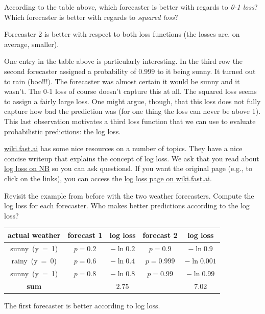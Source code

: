 \documentclass[assignment03_Solutions]{subfiles}
\begin{document}
\vspace{1em}

\begin{understandingcheck}
According to the table above, which forecaster is better with regards to \emph{0-1 loss}?  Which forecaster is better with regards to \emph{squared loss}?

\begin{boxedsolution}
Forecaster 2 is better with respect to both loss functions (the losses are, on average, smaller).
\end{boxedsolution}
\end{understandingcheck}

One entry in the table above is particularly interesting.  In the third row the second forecaster assigned a probability of $0.999$ to it being sunny.  It turned out to rain (boo!!!).  The forecaster was almost certain it would be sunny and it wasn't.  The 0-1 loss of course doesn't capture this at all.  The squared loss seems to assign a fairly large loss.  One might argue, though, that this loss does not fully capture how bad the prediction was (for one thing the loss can never be above 1).  This last observation motivates a third loss function that we can use to evaluate probabilistic predictions: the log loss.
\vspace{1em}
\begin{externalresources}[(30 minutes)]
\url{wiki.fast.ai} has some nice resources on a number of topics.  They have a nice concise writeup that explains the concept of log loss.  We ask that you read about \href{http://nb.mit.edu/f/55213}{log loss on NB} so you can ask questionsl.  If you want the original page (e.g., to click on the links), you can access the \href{http://wiki.fast.ai/index.php/Log_Loss}{log loss page on wiki.fast.ai}.
\begin{exercise}
Revisit the example from before with the two weather forecasters.  Compute the log loss for each forecaster.  Who makes better predictions according to the log loss?
\begin{boxedsolution}
\begin{center}
\small
\begin{tabular}{c | c | c | c | c }
\hline
actual weather & forecast 1 & log loss & forecast 2 & log loss \\
\hline
\mbox{sunny (y = 1)} & $p = 0.2$ & $-\ln 0.2$ & $p = 0.9$ &  $-\ln 0.9$\\
\mbox{rainy (y = 0)} & $p = 0.6$  &  $-\ln 0.4$ & $p = 0.999$ &  $-\ln 0.001$\\ 
\mbox{sunny (y = 1)} & $p = 0.8$ & $-\ln 0.8$ & $p = 0.99$ & $-\ln 0.99$\\
\hline
\textbf{sum} & & $2.75$ &  & 7.02
\end{tabular}
\end{center}
The first forecaster is better according to log loss.

\end{boxedsolution}

\end{exercise}
\end{externalresources}
\end{document}
